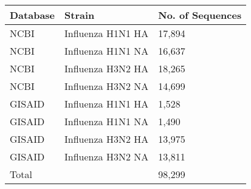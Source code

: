 \begin{tabular}{L{.7in}|L{1.55in}|L{.95in}}\hline
Database & Strain & No. of Sequences \\\hline
NCBI& Influenza  H1N1  HA &17,894\\\hline
NCBI& Influenza  H1N1  NA &16,637\\\hline
NCBI& Influenza  H3N2  HA &18,265\\\hline
NCBI& Influenza  H3N2  NA &14,699\\\hline
GISAID& Influenza  H1N1  HA &1,528\\\hline
GISAID& Influenza  H1N1  NA &1,490\\\hline
GISAID& Influenza  H3N2  HA &13,975\\\hline
GISAID& Influenza  H3N2  NA &13,811\\\hline
Total & &98,299\\\hline
\end{tabular}